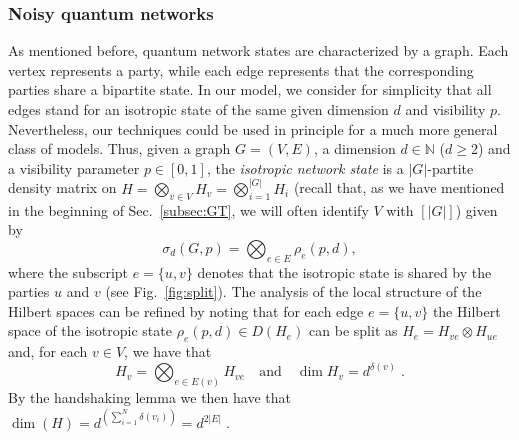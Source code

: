 \documentclass[a4paper,onecolumn,accepted=2024-12-14]{quantumarticle}
\theoremstyle{plain}
\newcommand{\quadtext}[1]{\quad\text{#1}\quad}
\begin{document}
\subsubsection{Noisy quantum networks}\label{subsed:noisy}
As mentioned before, quantum network states are characterized by a graph. Each vertex represents a party, while each edge represents that the corresponding parties share a bipartite state. In our model, we consider for simplicity that all edges stand for an isotropic state of the same given dimension $d$ and visibility $p$. Nevertheless, our techniques could be used in principle for a much more general class of models. Thus, given a graph $G=(V,E)$, a dimension $d\in\mathbb{N}$ ($d\geq2$) and a visibility parameter $p\in[0,1]$, the \textit{isotropic network state} is a $|G|$-partite density matrix on $H=\bigotimes_{v\in V}H_v=\bigotimes_{i=1}^{|G|}H_i$ (recall that, as we have mentioned in the beginning of Sec.~\ref{subsec:GT}, we will often identify $V$ with $[|G|]$) given by
\begin{equation}\label{networkGdp}
\sigma_d(G,p)= \bigotimes_{e\in E}\rho_e(p,d),
\end{equation}
where the subscript $e=\{u,v\}$ denotes that the isotropic state is shared by the
parties $u$ and $v$ (see Fig.~\ref{fig:split}). The analysis of the local structure of the Hilbert spaces can be refined by noting that for each edge $e=\{u,v\}$ the Hilbert space of the isotropic state
$\rho_e(p,d)\in D(H_e)$ can be split as
$H_e=H_{ve}\otimes H_{ue}$ and, for each
$v\in V$, we have that
\begin{equation}\label{eq:ie}
H_v=\bigotimes_{e\in E(v)}H_{ve}
\quadtext{and}
\dim H_v=d^{\delta(v)}\;.
\end{equation}
By the handshaking lemma we then have that
$
 \dim(H)=d^{\left(\sum_{i=1}^N \delta(v_i)\right)}=d^{2|E|}\;.
$
\vspace{-0.2cm}
\end{document}

